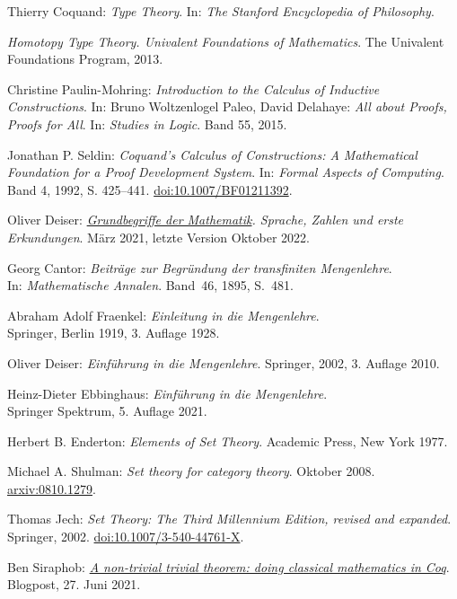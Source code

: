\begin{thebibliography}{00}
 Thierry Coquand:
\emph{Type Theory}. In: \emph{The Stanford Encyclopedia of Philosophy}.

\emph{Homotopy Type Theory. Univalent Foundations of Mathematics}.
The Univalent Foundations Program, 2013.

 Christine Paulin-Mohring:
\emph{Introduction to the Calculus of Inductive Constructions}. In:
Bruno Woltzenlogel Paleo, David Delahaye: \emph{All about Proofs, Proofs for All}.
In: \emph{Studies in Logic}. Band 55, 2015.

 Jonathan P. Seldin:
\emph{Coquand's Calculus of Constructions: A Mathematical Foundation
for a Proof Development System}. In: \emph{Formal Aspects of Computing}.
Band 4, 1992, S. 425--441.
\href{https://doi.org/10.1007/BF01211392}{doi:10.1007/BF01211392}.

Oliver Deiser:
\emph{\href{https://www.aleph1.info/?call=Puc&permalink=grundbegriffe}%
{Grundbegriffe der Mathematik}. Sprache, Zahlen und erste
Erkundungen}. März 2021, letzte Version Oktober 2022.

 Georg Cantor:
\emph{Beiträge zur Begründung der transfiniten Mengenlehre}.\\
In: \emph{Mathematische Annalen}. Band~46, 1895, S.~481.

 Abraham Adolf Fraenkel:
\emph{Einleitung in die Mengenlehre}.\\
Springer, Berlin 1919, 3. Auflage 1928.

 Oliver Deiser:
\emph{Einführung in die Mengenlehre}.
Springer, 2002, 3. Auflage 2010.

 Heinz-Dieter Ebbinghaus:
\emph{Einführung in die Mengenlehre}.\\
Springer Spektrum, 5. Auflage 2021.

 Herbert B. Enderton:
\emph{Elements of Set Theory}. Academic Press, New York 1977.

 Michael A. Shulman:
\emph{Set theory for category theory}.
Oktober 2008.\\
\href{https://arxiv.org/abs/0810.1279}{arxiv:0810.1279}.

 Thomas Jech: \emph{Set Theory: The Third Millennium
Edition, revised and expanded}. Springer, 2002.
\href{https://doi.org/10.1007/3-540-44761-X}{doi:10.1007/3-540-44761-X}.

 Ben Siraphob:
\href{https://siraben.dev/2021/06/27/classical-math-coq.html}{%
\emph{A non-trivial trivial theorem: doing classical mathematics in Coq}}.
Blogpost, 27. Juni 2021.


\end{thebibliography}
